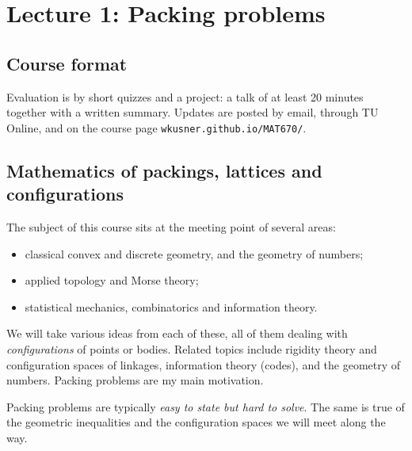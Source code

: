 \chapter{Lecture 1: Packing problems}
\label{L1:chap}

\section{Course format}
\label{L1:sec:admin}
Evaluation is by short quizzes and a project: a talk of at least 20 minutes
together with a written summary. Updates are posted by email, through TU Online,
and on the course page \texttt{wkusner.github.io/MAT670/}.

\section{Mathematics of packings, lattices and configurations}
\label{L1:sec:overview}

The subject of this course sits at the meeting point of several areas:
\begin{itemize}[nosep]
  \item classical convex and discrete geometry, and the geometry of numbers;
  \item applied topology and Morse theory;
  \item statistical mechanics, combinatorics and information theory.
\end{itemize}
We will take various ideas from each of these, all of them dealing with
\emph{configurations} of points or bodies. Related topics include rigidity theory
and configuration spaces of linkages, information theory (codes), and the geometry
of numbers. Packing problems are my main motivation.

Packing problems are typically \emph{easy to state but hard to solve}. The same
is true of the geometric inequalities and the configuration spaces we will meet
along the way.

\begin{remark}
\end{remark}

